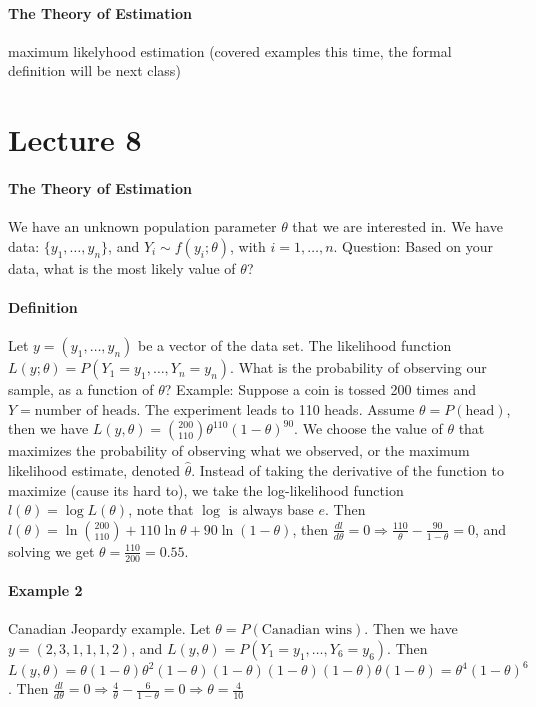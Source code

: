 \documentclass[10pt,letter]{article}
\theoremstyle{plain}
\theoremstyle{definition}
\begin{document}
\paragraph{The Theory of Estimation}
maximum likelyhood estimation (covered examples this time, the formal definition will be next class)

\section*{Lecture 8}
\paragraph{The Theory of Estimation}
We have an unknown population parameter $\theta$ that we are interested in. We have data: $\{y_1,\ldots,y_n\}$, and $Y_i\sim f(y_i;\theta)$, with $i=1,\ldots,n$. Question: Based on your data, what is the most likely value of $\theta$? 
\paragraph{Definition}
Let $y=(y_1,\ldots,y_n)$ be a vector of the data set. The likelihood function $L(y;\theta)=P(Y_1=y_1,\ldots,Y_n=y_n)$. What is the probability of observing our sample, as a function of $\theta$? Example: Suppose a coin is tossed 200 times and $Y=\text{number of heads}$. The experiment leads to 110 heads. Assume $\theta=P(\text{head})$, then we have $L(y,\theta)={200\choose 110}\theta^{110}(1-\theta)^{90}$. We choose the value of $\theta$ that maximizes the probability of observing what we observed, or the maximum likelihood estimate, denoted $\hat{\theta}$. Instead of taking the derivative of the function to maximize (cause its hard to), we take the log-likelihood function $l(\theta)=\log L(\theta)$, note that $\log$ is always base $e$. Then $l(\theta)=\ln{200\choose 110}+110\ln\theta+90\ln(1-\theta)$, then $\frac{dl}{d\theta}=0\Rightarrow \frac{110}{\theta}-\frac{90}{1-\theta}=0$, and solving we get $\theta=\frac{110}{200}=0.55$. 
\paragraph{Example 2}
Canadian Jeopardy example. Let $\theta=P(\text{Canadian wins})$. Then we have $y=(2,3,1,1,1,2)$, and $L(y,\theta)=P(Y_1=y_1,\ldots,Y_6=y_6)$. Then $L(y,\theta)=\theta(1-\theta)\theta^2(1-\theta)(1-\theta)(1-\theta)(1-\theta)\theta(1-\theta)=\theta^4(1-\theta)^6$. Then $\frac{dl}{d\theta}=0\Rightarrow \frac{4}{\theta}-\frac{6}{1-\theta}=0\Rightarrow \theta=\frac{4}{10}$ 
\end{document}
